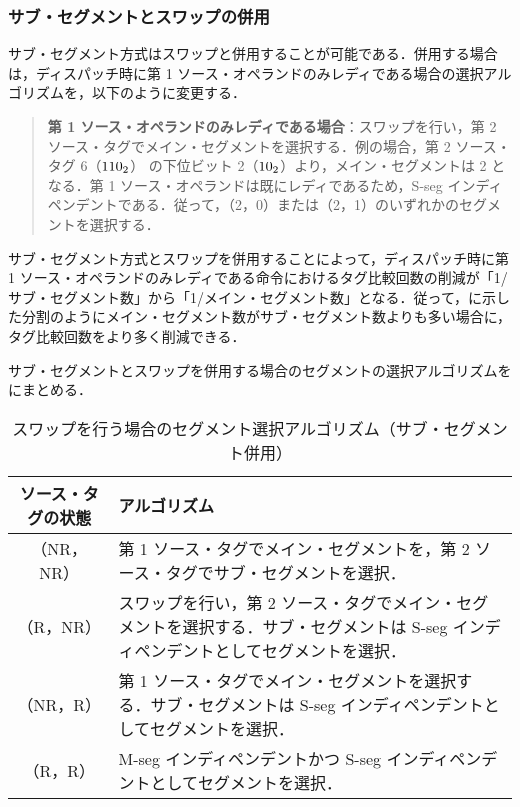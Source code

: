 \subsubsection{サブ・セグメントとスワップの併用}
サブ・セグメント方式はスワップと併用することが可能である．併用する場合は，ディスパッチ時に第 1 ソース・オペランドのみレディである場合の選択アルゴリズムを，以下のように変更する．
\begin{quote}
  \textbf{第 1 ソース・オペランドのみレディである場合}：スワップを行い，第 2 ソース・タグでメイン・セグメントを選択する．例の場合，第 2 ソース・タグ 6（${\rm 110_2}$） の下位ビット 2（${\rm 10_2}$）より，メイン・セグメントは 2 となる．第 1 ソース・オペランドは既にレディであるため，S-seg インディペンデントである．従って，（2，0）または（2，1）のいずれかのセグメントを選択する．
\end{quote}
サブ・セグメント方式とスワップを併用することによって，ディスパッチ時に第 1 ソース・オペランドのみレディである命令におけるタグ比較回数の削減が「1/サブ・セグメント数」から「1/メイン・セグメント数」となる．従って，に示した分割のようにメイン・セグメント数がサブ・セグメント数よりも多い場合に，タグ比較回数をより多く削減できる．

サブ・セグメントとスワップを併用する場合のセグメントの選択アルゴリズムをにまとめる．

\begin{table}[htb]
  \caption{スワップを行う場合のセグメント選択アルゴリズム（サブ・セグメント併用）}
  \footnotesize
  \center
   \begin{tabular}{|c|p{13cm}|} \hline \hline
    ソース・タグの状態 & アルゴリズム \\ \hline
    （NR，NR） & 第 1 ソース・タグでメイン・セグメントを，第 2 ソース・タグでサブ・セグメントを選択． \\ \hline
    （R，NR） & スワップを行い，第 2 ソース・タグでメイン・セグメントを選択する．サブ・セグメントは S-seg インディペンデントとしてセグメントを選択．\\ \hline
    （NR，R） & 第 1 ソース・タグでメイン・セグメントを選択する．サブ・セグメントは S-seg インディペンデントとしてセグメントを選択．\\ \hline
    （R，R） & M-seg インディペンデントかつ S-seg インディペンデントとしてセグメントを選択． \\ \hline
  \end{tabular}
  \label{tab:agg_algorithm_subseg}
\end{table}

